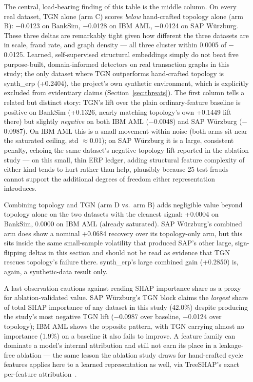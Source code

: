 The central, load-bearing finding of this table is the middle column. On every real dataset, TGN alone (arm C) scores \emph{below} hand-crafted topology alone (arm B): $-$0.0123 on BankSim, $-$0.0128 on IBM AML, $-$0.0124 on SAP Würzburg. These three deltas are remarkably tight given how different the three datasets are in scale, fraud rate, and graph density --- all three cluster within 0.0005 of $-$0.0125. Learned, self-supervised structural embeddings simply do not beat five purpose-built, domain-informed detectors on real transaction graphs in this study; the only dataset where TGN outperforms hand-crafted topology is synth\_erp (+0.2404), the project's own synthetic environment, which is explicitly excluded from evidentiary claims (Section~\ref{sec:threats}). The first column tells a related but distinct story: TGN's lift over the plain ordinary-feature baseline is positive on BankSim (+0.1326, nearly matching topology's own +0.1449 lift there) but slightly \emph{negative} on both IBM AML ($-$0.0048) and SAP Würzburg ($-$0.0987). On IBM AML this is a small movement within noise (both arms sit near the saturated ceiling, std $\approx$0.01); on SAP Würzburg it is a large, consistent penalty, echoing the same dataset's negative topology lift reported in the ablation study --- on this small, thin ERP ledger, adding structural feature complexity of either kind tends to hurt rather than help, plausibly because 25 test frauds cannot support the additional degrees of freedom either representation introduces.

Combining topology and TGN (arm D vs.\ arm B) adds negligible value beyond topology alone on the two datasets with the cleanest signal: +0.0004 on BankSim, 0.0000 on IBM AML (already saturated). SAP Würzburg's combined arm does show a nominal +0.0684 recovery over its topology-only arm, but this sits inside the same small-sample volatility that produced SAP's other large, sign-flipping deltas in this section and should not be read as evidence that TGN rescues topology's failure there. synth\_erp's large combined gain (+0.2850) is, again, a synthetic-data result only.

A last observation cautions against reading SHAP importance share as a proxy for ablation-validated value. SAP Würzburg's TGN block claims the \emph{largest} share of total SHAP importance of any dataset in this study (42.0\%) despite producing the study's most negative TGN lift ($-$0.0987 over baseline, $-$0.0124 over topology); IBM AML shows the opposite pattern, with TGN carrying almost no importance (1.9\%) on a baseline it also fails to improve. A feature family can dominate a model's internal attribution and still not earn its place in a leakage-free ablation --- the same lesson the ablation study draws for hand-crafted cycle features applies here to a learned representation as well, via TreeSHAP's exact per-feature attribution~\cite{lundberg2017unified,lundberg2020local}.

